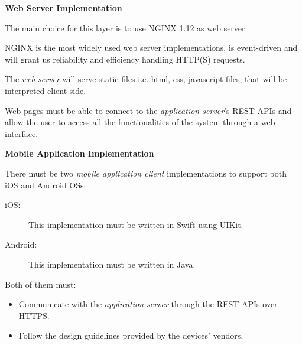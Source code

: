 \documentclass{article}
\begin{document}
	\newpage
	\bigskip
	\noindent
	\textbf{Web Server Implementation}

	\medskip
	\noindent
	The main choice for this layer is to use NGINX 1.12 as web server.

	NGINX is the most widely used web server implementations, is event-driven and will grant us reliability and efficiency handling HTTP(S) requests.

	\bigskip
	The \textit{web server} will serve static files i.e. html, css, javascript files, that will be interpreted client-side.

	Web pages must be able to connect to the \textit{application server}'s REST APIs and allow the user to access all the functionalities of the system through a web interface.


	\bigskip
	\noindent
	\textbf{Mobile Application Implementation}

	\medskip
	\noindent
	There must be two \textit{mobile application client} implementations to support both iOS and Android OSs:
	\begin{description}
		\item [iOS:] This implementation must be written in Swift using UIKit.
		\item [Android:] This implementation must be written in Java.
	\end{description}

	\bigskip
	\noindent
	Both of them must:
	\begin{itemize}
	\item Communicate with the \textit{application server} through the REST APIs over HTTPS.
	\item Follow the design guidelines provided by the devices' vendors.
	\end{itemize}
\end{document}
